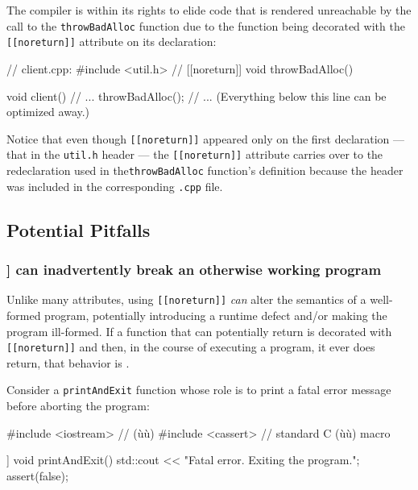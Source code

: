 \noindent The compiler is within its
rights to elide code that is rendered unreachable by the call to the
\lstinline!throwBadAlloc! function due to the function being decorated with the
\lstinline![[noreturn]]! attribute on its declaration:

\begin{emcppslisting}[emcppsbatch=e4]
// client.cpp:
#include <util.h>  // [[noreturn]] void throwBadAlloc()

void client()
{
    // ...
    throwBadAlloc();
    // ... (Everything below this line can be optimized away.)
}
\end{emcppslisting}


\noindent Notice that even though \lstinline![[noreturn]]! appeared only on the first
declaration --- that in the \lstinline!util.h! header --- the \lstinline![[noreturn]]!
attribute carries over to the redeclaration used in the\linebreak[4] \lstinline!throwBadAlloc!
function's definition because the header was included in the
corresponding \lstinline!.cpp! file.

\subsection[Potential Pitfalls]{Potential Pitfalls}\label{noreturn-potential-pitfalls}

\subsubsection[\tt{[[noreturn]]} can inadvertently break an otherwise working program]{{\SubsubsecCode [[noreturn]]} can inadvertently break an otherwise working program}\label{[[noreturn]]-can-inadvertently-break-an-otherwise-working-program}

Unlike many attributes, using \lstinline![[noreturn]]! \emph{can} alter
the semantics of a well-formed program, potentially introducing a
runtime defect and/or making the program ill-formed. If a function that
can potentially return is decorated with \lstinline![[noreturn]]! and then,
in the course of executing a program, it ever does return, that behavior
is .

Consider a \lstinline!printAndExit! function whose role is to print a fatal
error message before aborting the program:

\begin{emcppshiddenlisting}[emcppsbatch=e5]
#include <iostream>  // (ù{}ù)
#include <cassert>   // standard C (ù{}ù) macro
\end{emcppshiddenlisting}
\begin{emcppslisting}[emcppsbatch=e5]
[[noreturn]] void printAndExit()
{
    std::cout << "Fatal error. Exiting the program.\n";
    assert(false);
}
\end{emcppslisting}

